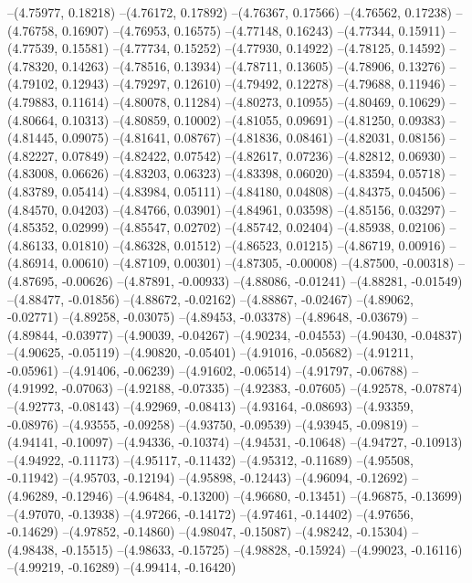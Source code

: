 --(4.75977, 0.18218)
--(4.76172, 0.17892)
--(4.76367, 0.17566)
--(4.76562, 0.17238)
--(4.76758, 0.16907)
--(4.76953, 0.16575)
--(4.77148, 0.16243)
--(4.77344, 0.15911)
--(4.77539, 0.15581)
--(4.77734, 0.15252)
--(4.77930, 0.14922)
--(4.78125, 0.14592)
--(4.78320, 0.14263)
--(4.78516, 0.13934)
--(4.78711, 0.13605)
--(4.78906, 0.13276)
--(4.79102, 0.12943)
--(4.79297, 0.12610)
--(4.79492, 0.12278)
--(4.79688, 0.11946)
--(4.79883, 0.11614)
--(4.80078, 0.11284)
--(4.80273, 0.10955)
--(4.80469, 0.10629)
--(4.80664, 0.10313)
--(4.80859, 0.10002)
--(4.81055, 0.09691)
--(4.81250, 0.09383)
--(4.81445, 0.09075)
--(4.81641, 0.08767)
--(4.81836, 0.08461)
--(4.82031, 0.08156)
--(4.82227, 0.07849)
--(4.82422, 0.07542)
--(4.82617, 0.07236)
--(4.82812, 0.06930)
--(4.83008, 0.06626)
--(4.83203, 0.06323)
--(4.83398, 0.06020)
--(4.83594, 0.05718)
--(4.83789, 0.05414)
--(4.83984, 0.05111)
--(4.84180, 0.04808)
--(4.84375, 0.04506)
--(4.84570, 0.04203)
--(4.84766, 0.03901)
--(4.84961, 0.03598)
--(4.85156, 0.03297)
--(4.85352, 0.02999)
--(4.85547, 0.02702)
--(4.85742, 0.02404)
--(4.85938, 0.02106)
--(4.86133, 0.01810)
--(4.86328, 0.01512)
--(4.86523, 0.01215)
--(4.86719, 0.00916)
--(4.86914, 0.00610)
--(4.87109, 0.00301)
--(4.87305, -0.00008)
--(4.87500, -0.00318)
--(4.87695, -0.00626)
--(4.87891, -0.00933)
--(4.88086, -0.01241)
--(4.88281, -0.01549)
--(4.88477, -0.01856)
--(4.88672, -0.02162)
--(4.88867, -0.02467)
--(4.89062, -0.02771)
--(4.89258, -0.03075)
--(4.89453, -0.03378)
--(4.89648, -0.03679)
--(4.89844, -0.03977)
--(4.90039, -0.04267)
--(4.90234, -0.04553)
--(4.90430, -0.04837)
--(4.90625, -0.05119)
--(4.90820, -0.05401)
--(4.91016, -0.05682)
--(4.91211, -0.05961)
--(4.91406, -0.06239)
--(4.91602, -0.06514)
--(4.91797, -0.06788)
--(4.91992, -0.07063)
--(4.92188, -0.07335)
--(4.92383, -0.07605)
--(4.92578, -0.07874)
--(4.92773, -0.08143)
--(4.92969, -0.08413)
--(4.93164, -0.08693)
--(4.93359, -0.08976)
--(4.93555, -0.09258)
--(4.93750, -0.09539)
--(4.93945, -0.09819)
--(4.94141, -0.10097)
--(4.94336, -0.10374)
--(4.94531, -0.10648)
--(4.94727, -0.10913)
--(4.94922, -0.11173)
--(4.95117, -0.11432)
--(4.95312, -0.11689)
--(4.95508, -0.11942)
--(4.95703, -0.12194)
--(4.95898, -0.12443)
--(4.96094, -0.12692)
--(4.96289, -0.12946)
--(4.96484, -0.13200)
--(4.96680, -0.13451)
--(4.96875, -0.13699)
--(4.97070, -0.13938)
--(4.97266, -0.14172)
--(4.97461, -0.14402)
--(4.97656, -0.14629)
--(4.97852, -0.14860)
--(4.98047, -0.15087)
--(4.98242, -0.15304)
--(4.98438, -0.15515)
--(4.98633, -0.15725)
--(4.98828, -0.15924)
--(4.99023, -0.16116)
--(4.99219, -0.16289)
--(4.99414, -0.16420)
